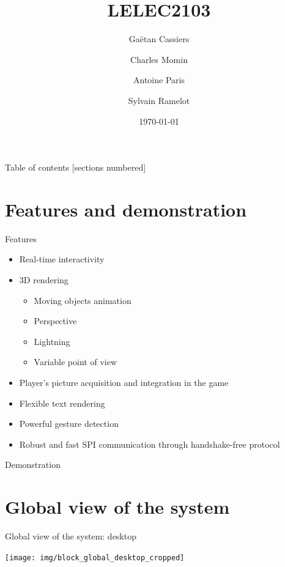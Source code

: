 \documentclass[10pt, notes]{beamer}
\title{LELEC2103}
\subtitle{}
\date{\today}
\author{Gaëtan Cassiers\and Charles Momin \and Antoine Paris \and Sylvain Ramelot}
\institute{Ecole polytechnique de Louvain}
\begin{document}
\maketitle
{}

\begin{frame}{Table of contents}
  [sections numbered]
  \tableofcontents%
\end{frame}


\section{Features and demonstration}
\begin{frame}{Features}
    \begin{itemize}
        \item Real-time interactivity
        \item 3D rendering
        \begin{itemize}
            \item Moving objects animation
            \item Perspective
            \item Lightning
            \item Variable point of view
        \end{itemize}
        \item Player's picture acquisition and integration in the game
        \item Flexible text rendering
        \item Powerful gesture detection
        \item Robust and fast SPI communication through handshake-free protocol
    \end{itemize}
\end{frame}

\begin{frame}{Demonstration}
\end{frame}

\section{Global view of the system}
\begin{frame}{Global view of the system: desktop}
    \begin{center}
        \texttt{[image: img/block\_global\_desktop\_cropped]}
    \end{center}
\end{frame}
\end{document}
